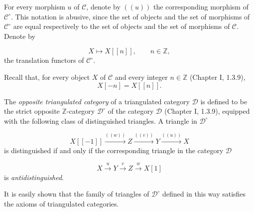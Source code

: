 For every morphism $u$ of $\mathcal C$, denote by $((u))$ the
corresponding morphism of $\mathcal C^\circ$. This notation is abusive,
since the set of objects and the set of morphisms of $\mathcal C^\circ$
are equal respectively to the set of objects and the set of morphisms of
$\mathcal C$. Denote by

\[
  X\longmapsto X[[n]],\qquad n\in\mathbb Z,
\]
the translation functors of $\mathcal C^\circ$.

Recall that, for every object $X$ of $\mathcal C$ and every integer
$n\in\mathbb Z$ (Chapter I, 1.3.9),
\[
  X[-n]=X[[n]].
\]

The \emph{opposite triangulated category} of a triangulated category
$\mathcal D$ is defined to be the strict opposite $\mathbb Z$-category
$\mathcal D^\circ$ of the category $\mathcal D$ (Chapter I, 1.3.9),
equipped with the following class of distinguished triangles. A triangle
in $\mathcal D^\circ$

\[
  X[[-1]]\xrightarrow{((w))}Z\xrightarrow{((v))}Y
  \xrightarrow{((u))}X
\]
is distinguished if and only if the corresponding triangle in the
category $\mathcal D$

\[
  X\xrightarrow{u}Y\xrightarrow{v}Z\xrightarrow{w}X[1]
\]
is \emph{antidistinguished}.

It is easily shown that the family of triangles of $\mathcal D^\circ$
defined in this way satisfies the axioms of triangulated categories.
\endgroup


